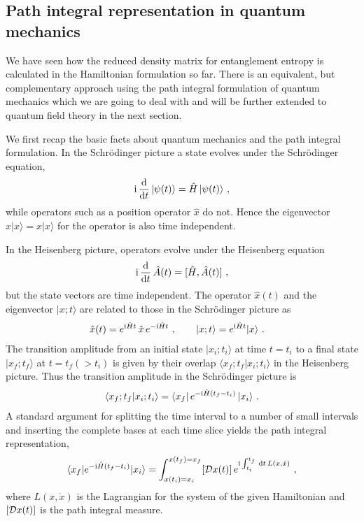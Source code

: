 \subsection{Path integral representation in quantum mechanics}
We have seen how the reduced density matrix for entanglement entropy is calculated in the Hamiltonian formulation so far.
There is an equivalent, but complementary approach using the path integral formulation of quantum mechanics which we are going to deal with and will be further extended to quantum field theory in the next section.

We first recap the basic facts about quantum mechanics and the path integral formulation.
In the Schr\"odinger picture a state evolves under the Schr\"odinger equation,
\begin{align}
	\mathrm{i}\, \frac{\mathrm{d}}{\mathrm{d} t}\, |\psi (t)\rangle = \hat H\,  |\psi (t)\rangle \ ,
\end{align}
while operators such as a position operator $\hat x$ do not.
Hence the eigenvector $\hat x |x\rangle = x| x\rangle$ for the operator is also time independent.

In the Heisenberg picture, operators evolve under the Heisenberg equation
\begin{align}
	\mathrm{i}\, \frac{\mathrm{d}}{\mathrm{d} t}\, \hat A(t) = [\hat H, \hat A(t)] \ ,
\end{align}
but the state vectors are time independent.
The operator $\hat x(t)$ and the eigenvector $|x; t \rangle$ are related to those in the Schr{\"o}dinger picture as
\begin{align}
	\hat x(t) &= e^{\mathrm{i} \hat H t}\, \hat x\,e^{-\mathrm{i} \hat H t} \ , \qquad
	|x; t \rangle = e^{\mathrm{i} \hat H t} |x\rangle \ .
\end{align}
The transition amplitude from an initial state $|x_i; t_i\rangle$ at time $t=t_i$ to a final state $|x_f; t_f\rangle$ at $t=t_f (>t_i)$ is given by their overlap $\langle x_f; t_f |x_i; t_i\rangle$ in the Heisenberg picture.
Thus the transition amplitude in the Schr\"odinger picture is
\begin{align}
	\langle x_f; t_f |x_i; t_i\rangle = \langle x_f |\, e^{-\mathrm{i} \hat H(t_f - t_i)}\,|x_i\rangle \ .
\end{align}
A standard argument for splitting the time interval to a number of small intervals and inserting the complete bases at each time slice yields the path integral representation,
\begin{align}\label{QMkernel}
	\langle x_f | e^{-\mathrm{i} \hat H(t_f - t_i)}|x_i\rangle = \int_{x(t_i) = x_i}^{x(t_f) = x_f} [{\cal D} x(t)]\, e^{\mathrm{i} \int_{t_i}^{t_f}\, \mathrm{d} t \,L(x, \dot x)} \ ,
\end{align}
where $L(x, \dot x)$ is the Lagrangian for the system of the given Hamiltonian and $[{\cal D} x(t)]$ is the path integral measure.

